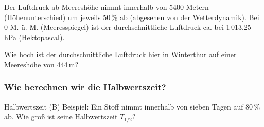 


Der Luftdruck ab Meereshöhe nimmt innerhalb von 5400 Metern
(Höhenunterschied) um jeweils 50\,\% ab (abgesehen von der
Wetterdynamik). Bei 0 M. ü. M. (Meeresspiegel) ist der
durchschnittliche Luftdruck ca. bei 1\,013.25 hPa (Hektopascal).

Wie hoch ist der durchschnittliche Luftdruck hier in Winterthur auf
einer Meereshöhe von 444\,m?




\newpage

\subsubsection*{Wie berechnen wir die Halbwertszeit?}


\begin{beispiel}{Halbwertszeit (B)}{}
Beispiel: Ein Stoff nimmt innerhalb von sieben Tagen auf 80\,\% ab. Wie
groß ist seine Halbwertszeit $T_{1/2}$?
\end{beispiel}




